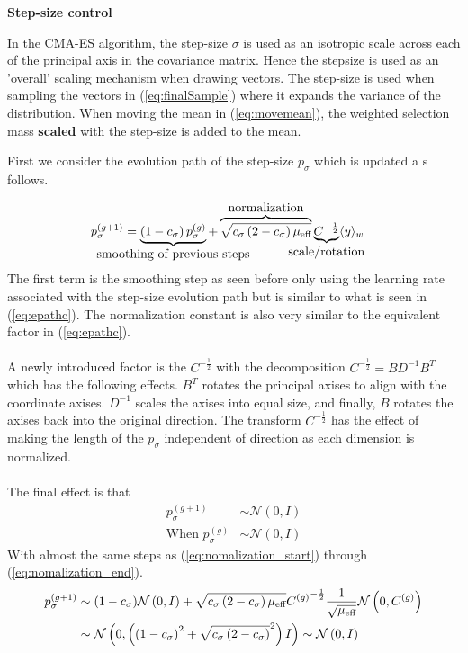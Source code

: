 \textbf{Step-size control}

In the CMA-ES algorithm, the step-size $\sigma$ is used as an isotropic scale across
each of the principal axis in the covariance matrix. Hence the stepsize is used as 
an 'overall' scaling mechanism when drawing vectors. The step-size is used when 
sampling the vectors in (\ref{eq:finalSample}) where it expands the variance 
of the distribution. When moving the mean in (\ref{eq:movemean}), the weighted 
selection mass \textbf{scaled} with the step-size is added to the mean.

First we consider the evolution path of the step-size $p_\sigma$ which is
updated a s follows.

\begin{align}
p_{\sigma}^{(g+1)} &= 
\underbrace{\left( 1 - c_{\sigma} \right) p_{\sigma}^{(g)}}_{
\makebox[0pt]{\text{{smoothing of previous steps}}}
}
+ 
\overbrace{\sqrt{c_{\sigma} \left( 2 - c_{\sigma} \right) \meff}}
^{
\makebox[0pt]{\text{{normalization}}}
} 
\underbrace{C^{- \frac{1}{2}}}_{
\makebox[0pt]{\text{{scale/rotation}}}
}
\langle y \rangle_{w}
\end{align}
The first term is the smoothing step as seen before only using the learning rate 
associated with the step-size evolution path but is similar to what is seen in
(\ref{eq:epathc}). The normalization constant is also very similar to the
equivalent factor in (\ref{eq:epathc}).\\
\\
A newly introduced factor is the $C^{-\frac{1}{2}}$ with the decomposition
$C^{-\frac{1}{2}} = B D^{-1} B^{T}$ which has the following effects. $B^{T}$
rotates the principal axises to align with the coordinate axises. 
$D^{-1}$ scales the axises into equal size, and finally, $B$ rotates the 
axises back into the original direction. The transform $C^{-\frac{1}{2}}$
has the effect of making the length of the $p_\sigma$ independent of 
direction as each dimension is normalized.\\
\\
The final effect is that
\begin{align}
p_\sigma^{(g+1)} &\sim \mathcal{N}\left(0, I \right)\\
\text{When }
p_\sigma^{(g)} &\sim \mathcal{N} \left(0, I \right)
\end{align}
With almost the same steps as (\ref{eq:nomalization_start}) through 
(\ref{eq:nomalization_end}).
\begin{align}
p_\sigma^{(g+1)} &\sim (1 - c_\sigma) \mathcal{N}\left( 0, I \right) + \sqrt{c_\sigma 
\left( 2-c_\sigma \right)\mu_{\text{eff}} } {C^{(g)}}^{-\frac{1}{2}} \frac{1}{\sqrt{\mu_{\text{eff}}}}
\mathcal{N} \left( 0, C^{(g)} \right)\\
&\sim \mathcal{N} 
\left( 
  0, 
  \left(  
    \left( 
      1-c_\sigma 
    \right)^2 + \sqrt{c_\sigma 
    \left(  
      2 - c_\sigma
    \right)}^2
  \right) I
\right) \sim \mathcal{N} \left( 0, I \right)
\end{align}

